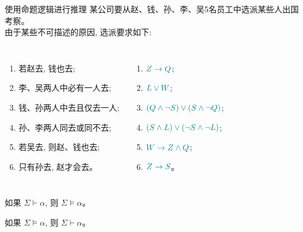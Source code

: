 \begin{frame}{}
  \begin{exampleblock}{使用命题逻辑进行推理}
    某公司要从赵、钱、孙、李、吴5名员工中选派某些人出国考察。\\
    由于某些不可描述的原因, 选派要求如下:

    \begin{columns}
        \begin{enumerate}[(1)]
          \item 若赵去, 钱也去;
          \item 李、吴两人中必有一人去;
          \item 钱、孙两人中去且仅去一人;
          \item 孙、李两人同去或同不去;
          \item 若吴去, 则赵、钱也去;
          \item 只有孙去, 赵才会去。
        \end{enumerate}
        \begin{enumerate}[(1)]
          \item $\textcolor{teal}{Z \to Q}$;
          \item $\textcolor{teal}{L \lor W}$;
          \item $\textcolor{teal}{(Q \land \lnot S) \lor (S \land \lnot Q)}$;
          \item $\textcolor{teal}{(S \land L) \lor (\lnot S \land \lnot L)}$;
          \item $\textcolor{teal}{W \to Z \land Q}$;
          \item $\textcolor{teal}{Z \to S}$。
        \end{enumerate}
    \end{columns}

    \vspace{0.50cm}
  \end{exampleblock}
\end{frame}

\begin{frame}{}
  \begin{theorem}
    如果 $\Sigma \vdash \alpha$, 则 $\Sigma \models \alpha$。
  \end{theorem}

  \vspace{0.30cm}
  \vspace{0.30cm}

  \begin{theorem}
    如果 $\Sigma \models \alpha$, 则 $\Sigma \vdash \alpha$。
  \end{theorem}
\end{frame}
